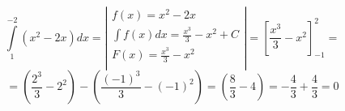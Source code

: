 \documentclass[a4paper,12pt]{article}
\begin{document}
$$ \int\limits_{1}^{-2}(x^{2} - 2x) dx = \left \vert \begin{array}{c} 
f(x)=x^{2} - 2x\\
\displaystyle{\int} f(x)dx = \frac{x^3}{3} - x^{2} + C\\
F(x) = \frac{x^{3}}{3} -x^2\\
\end{array} \right \vert 
= \left[ \frac{x^{3}}{3} -x^2  \right]_{-1}^{2} =$$
$$=\left( \frac{2^{3}}{3} - 2^{2}\right) - \left( \frac{(-1)^{3}}{3} -(-1)^{2}\right) = \left( \frac{8}{3} - 4\right) = -\frac{4}{3} + \frac{4}{3} = 0$$
\end{document}
